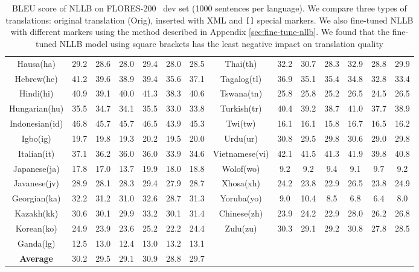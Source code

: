 \documentclass[11pt,dvipsnames]{article}
\begin{document}
\begin{table*}[t!]
{\begin{tabular}{ccccccc|ccccccc}
Hausa(ha)&29.2&28.6&28.0&29.4&28.0&28.5&Thai(th)&32.2&30.7&28.3&32.9&28.8&29.9\\
Hebrew(he)&41.2&39.6&38.9&39.4&35.6&37.1&Tagalog(tl)&36.9&35.1&35.4&34.8&32.8&33.4\\
Hindi(hi)&40.9&39.1&40.0&41.3&38.3&40.6&Tswana(tn)&25.8&25.8&25.2&26.5&24.5&26.5\\
Hungarian(hu)&35.5&34.7&34.1&35.5&33.0&33.8&Turkish(tr)&40.4&39.2&38.7&41.0&37.7&38.9\\
Indonesian(id)&46.8&45.7&45.7&46.5&43.9&45.3&Twi(tw)&16.1&16.1&15.8&16.7&16.5&16.2\\
Igbo(ig)&19.7&19.8&19.3&20.2&19.5&20.0&Urdu(ur)&30.8&29.5&29.8&30.6&29.0&29.8\\
Italian(it)&37.1&36.2&36.0&36.0&33.9&34.6&Vietnamese(vi)&42.1&41.5&41.3&41.9&39.8&40.8\\
Japanese(ja)&17.8&17.0&13.7&19.9&18.0&18.8&Wolof(wo)&9.2&9.2&9.4&9.1&9.7&9.2\\
Javanese(jv)&28.9&28.1&28.3&29.4&27.9&28.7&Xhosa(xh)&24.2&23.8&22.9&26.5&23.8&24.9\\
Georgian(ka)&32.2&31.2&31.0&32.6&28.7&31.3&Yoruba(yo)&9.0&10.4&8.5&6.8&6.4&8.0\\
Kazakh(kk)&30.6&30.1&29.9&33.2&30.1&31.4&Chinese(zh)&23.9&24.2&22.9&28.0&26.2&26.8\\
Korean(ko)&24.9&23.9&23.6&25.2&22.2&24.4&Zulu(zu)&30.3&29.1&29.2&30.8&27.8&28.5\\
Ganda(lg)&12.5&13.0&12.4&13.0&13.2&13.1&\\ \midrule
\textbf{Average}&30.2&29.5&29.1&30.9&28.8&29.7\\
\bottomrule
\end{tabular}
}
\vspace{-5pt}
\caption{BLEU score of NLLB on FLORES-200~\citep{nllb2022} dev set (1000 sentences per language). We compare three types of translations: original translation (Orig), inserted with XML and {\tt []} special markers. We also fine-tuned NLLB with different markers using the  method described in Appendix \ref{sec:fine-tune-nllb}. We found that the fine-tuned NLLB model using square brackets has the least negative impact on translation quality}
\label{table:bleu_corpus_full}
\vspace{-15pt}
\end{table*}
\end{document}
